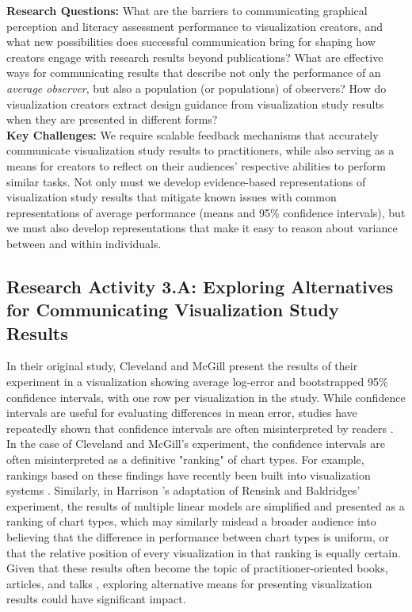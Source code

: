 \documentclass[11pt]{article}
\begin{document}
\noindent\hrulefill

\vspace{-0.5em}
\noindent\textbf{Research Questions:}
What are the barriers to communicating graphical perception and literacy assessment performance to visualization creators, and what new possibilities does successful communication bring for shaping how creators engage with research results beyond publications?
What are effective ways for communicating results that describe not only the performance of an \emph{average observer}, but also a population (or populations) of observers?
How do visualization creators extract design guidance from visualization study results when they are presented in different forms?
\\
\noindent\textbf{Key Challenges:}
We require scalable feedback mechanisms that accurately communicate visualization study results to practitioners, while also serving as a means for creators to reflect on their audiences' respective abilities to perform similar tasks.
Not only must we develop evidence-based representations of visualization study results that mitigate known issues with common representations of average performance (\eg means and 95\% confidence intervals), but we must also develop representations that make it easy to reason about variance between and within individuals.

\vspace{-1.0em}
\noindent\hrulefill


\subsection{Research Activity 3.A: Exploring Alternatives for Communicating Visualization Study Results}

In their original study, Cleveland and McGill present the results of their experiment in a visualization showing average log-error and bootstrapped 95\% confidence intervals, with one row per visualization in the study.
While confidence intervals are useful for evaluating differences in mean error, studies have repeatedly shown that confidence intervals are often misinterpreted by readers \cite{belia2005ci,hoekstra2014ci,correll2014error}.
In the case of Cleveland and McGill's experiment, the confidence intervals are often misinterpreted as a definitive "ranking" of chart types.
For example, rankings based on these findings have recently been built into visualization systems \eg \cite{mackinlay1986automating, mackinlay2007show}.
Similarly, in Harrison \etal's adaptation of Rensink and Baldridges' experiment, the results of multiple linear models are simplified and presented as a ranking of chart types, which may similarly mislead a broader audience into believing that the difference in performance between chart types is uniform, or that the relative position of every visualization in that ranking is equally certain.
Given that these results often become the topic of practitioner-oriented books, articles, and talks \eg \cite{berinato2016good, kirk2012data, yau2011visualize, elliott2016studies}, exploring alternative means for presenting visualization results could have significant impact.
\end{document}
